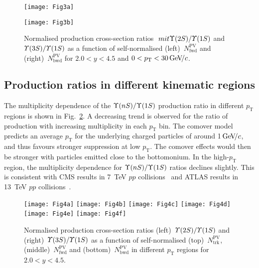 \documentclass[12pt,a4paper]{article}
\newcommand{\aunit}[1]{\ensuremath{\text{\,#1}}}
\newcommand{\gevc}{\ensuremath{\aunit{Ge\kern -0.1em V\!/}c}\xspace}
\def\pt         {\ensuremath{p_{\mathrm{T}}}\xspace}
\begin{document}
\begin{figure}[!tbp]
\centering
\begin{minipage}[t]{0.49\textwidth}
\centering
\texttt{[image: Fig3a]}
\end{minipage}
\begin{minipage}[t]{0.49\textwidth}
\centering
\texttt{[image: Fig3b]}
\end{minipage}
\caption{Normalised production cross-section ratios $\
mit\Upsilon(\mathrm{2}S)/\mit\Upsilon(\mathrm{1}S)$ and $\mit\Upsilon(\mathrm{3}S)/\mit\Upsilon(\mathrm{1}S)$ as a function of self-normalised (left)~$N_{\mathrm{fwd}}^{\mathrm{PV}}$ and (right)~$N_{\mathrm{bwd}}^{\mathrm{PV}}$ for $2.0<y<4.5$ and $0<\pt<30 \text{\,Ge\kern -0.1em V\!}/c$.} 
\label{fig:ratiofb}
\end{figure}


\subsection{Production ratios in different kinematic regions}
The multiplicity dependence of the $\Upsilon{(nS)}/\Upsilon{(1S)}$ production ratio in different \pt regions is shown in Fig.~\ref{fig:ratioy}. A decreasing trend is observed for the ratio of production with increasing multiplicity in each \pt bin. 
The comover model predicts an average \pt for the underlying charged particles of around 1\gevc, and thus favours stronger suppression at low \pt. 
The comover effects would then be stronger with particles emitted close to the bottomonium. In the high-\pt region, the multiplicity dependence for $\Upsilon{(nS)}/\Upsilon{(1S)}$ ratios declines slightly. This is consistent with CMS results in 7~TeV $pp$ collisions~\cite{CMS:2020fae} and ATLAS results in 13~TeV $pp$ collisions~\cite{ATLAS:2022xar}. 

\begin{figure}[!tbp]
\texttt{[image: Fig4a]}
\texttt{[image: Fig4b]}
\texttt{[image: Fig4c]}
\texttt{[image: Fig4d]}
\texttt{[image: Fig4e]}
\texttt{[image: Fig4f]}
\caption{Normalised production cross-section ratios (left)~$\mit\Upsilon(\mathrm{2}S)/\mit\Upsilon(\mathrm{1}S)$ and (right)~$\mit\Upsilon(\mathrm{3}S)/\mit\Upsilon(\mathrm{1}S)$ as a function of self-normalised (top)~$N_{\mathrm{trk}}^{\mathrm{PV}}$, (middle)~$N_{\mathrm{fwd}}^{\mathrm{PV}}$ and (bottom)~$N_{\mathrm{bwd}}^{\mathrm{PV}}$ in different $\pt$ regions for $2.0<y<4.5$.} 
\label{fig:ratioy}
\end{figure}
\end{document}
